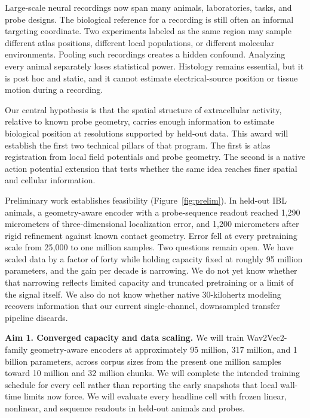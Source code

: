 \documentclass[10pt]{article}
\newcommand{\subheading}[1]{\vspace{3pt}{\normalsize\bfseries\color{nyublue}#1}\par\vspace{1pt}}
\begin{document}
Large-scale neural recordings now span many animals, laboratories, tasks, and probe designs. The biological reference for a recording is still often an informal targeting coordinate. Two experiments labeled as the same region may sample different atlas positions, different local populations, or different molecular environments. Pooling such recordings creates a hidden confound. Analyzing every animal separately loses statistical power. Histology remains essential, but it is post hoc and static, and it cannot estimate electrical-source position or tissue motion during a recording.

Our central hypothesis is that the spatial structure of extracellular activity, relative to known probe geometry, carries enough information to estimate biological position at resolutions supported by held-out data. This award will establish the first two technical pillars of that program. The first is atlas registration from local field potentials and probe geometry. The second is a native action potential extension that tests whether the same idea reaches finer spatial and cellular information.

Preliminary work establishes feasibility (Figure~\ref{fig:prelim}). In held-out IBL animals, a geometry-aware encoder with a probe-sequence readout reached 1,290 micrometers of three-dimensional localization error, and 1,200 micrometers after rigid refinement against known contact geometry. Error fell at every pretraining scale from 25,000 to one million samples. Two questions remain open. We have scaled data by a factor of forty while holding capacity fixed at roughly 95 million parameters, and the gain per decade is narrowing. We do not yet know whether that narrowing reflects limited capacity and truncated pretraining or a limit of the signal itself. We also do not know whether native 30-kilohertz modeling recovers information that our current single-channel, downsampled transfer pipeline discards.

\subheading{2. Objectives}
\textbf{Aim 1. Converged capacity and data scaling.} We will train Wav2Vec2-family geometry-aware encoders at approximately 95 million, 317 million, and 1 billion parameters, across corpus sizes from the present one million samples toward 10 million and 32 million chunks. We will complete the intended training schedule for every cell rather than reporting the early snapshots that local wall-time limits now force. We will evaluate every headline cell with frozen linear, nonlinear, and sequence readouts in held-out animals and probes.
\end{document}
